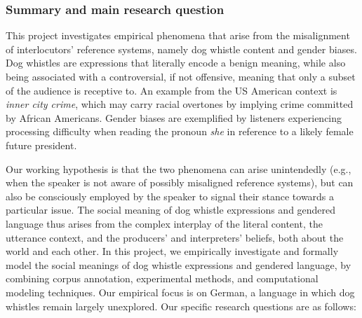 \documentclass[11pt]{article}
\newcommand{\dfgcomments}[1]{\textcolor{green}{#1}}
\renewcommand{\dfgcomments}[1]{}
\begin{document}

\dfgcomments{Antje: The following structure of subsections of 3.3 is proposed in the template, but it is said that this subsection CAN be structured in this way, so it is not mandatory. The structure of all other sections and subsections seems to be mandatory however.}

\subsubsection{Summary and main research question}

This project investigates empirical phenomena that arise from the misalignment of interlocutors' reference systems, namely dog whistle content and gender biases. Dog whistles are expressions that literally encode a benign meaning, while also being associated with a controversial, if not offensive, meaning that only a subset of the audience is receptive to. An example from the US American context is {\em inner city crime}, which may carry racial overtones by implying crime committed by African Americans. Gender biases are exemplified by listeners experiencing processing difficulty when reading the pronoun {\em she} in reference to a likely female future president.

Our working hypothesis is that the two phenomena can arise unintendedly (e.g., when the speaker is not aware of possibly misaligned reference systems), but can also be consciously employed by the speaker to signal their stance towards a particular issue. The  social meaning of dog whistle expressions and gendered language thus arises from the complex interplay of the literal content, the utterance context, and the producers' and interpreters' beliefs, both about the world and each other. In this project, we empirically investigate and formally model the social meanings of  dog whistle expressions and gendered language, by combining corpus annotation, experimental methods, and computational modeling techniques. Our empirical focus is on German, a language in which dog whistles remain largely unexplored. Our specific research questions are as follows:
\end{document}
